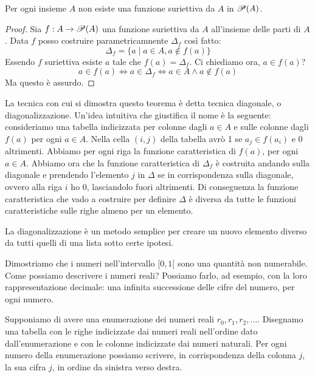 \begin{thm}
    Per ogni insieme $A$ non esiste una funzione suriettiva da $A$ in $\mathscr{P}(A)$.
\end{thm}
\begin{proof}
    Sia $f : A \to \mathscr{P}(A)$ una funzione suriettiva da $A$ all'insieme delle parti di $A$. Data
    $f$ posso costruire parametricamnente $\Delta_{f}$ così fatto:
    \begin{equation*}
        \Delta_{f} = \{a \mid a \in A, a \notin f(a)\}
    \end{equation*}
    Essendo $f$ suriettiva esiste $a$ tale che $f(a) = \Delta_{f}$. Ci chiediamo ora, $a \in f(a)$?
    \begin{equation*}
        a \in f(a) \iff a \in \Delta_{f} \iff a \in A \land a \notin f(a)
    \end{equation*}
    Ma questo è assurdo.
\end{proof}

La tecnica con cui si dimostra questo teorema è detta tecnica diagonale, o diagonalizzazione.
Un'idea intuitiva che giustifica il nome è la seguente: consideriamo una tabella indicizzata per
colonne dagli $a \in A$ e sulle colonne dagli $f(a)$ per ogni $a \in A$. Nella cella $(i,j)$ della
tabella avrò 1 se $a_{j} \in f(a_{i})$ e 0 altrimenti. Abbiamo per ogni riga la funzione
caratteristica di $f(a)$, per ogni $a \in A$. Abbiamo ora che la funzione caratteristica di
$\Delta_{f}$ è costruita andando sulla diagonale e prendendo l'elemento $j$ in $\Delta$ se in
corrispondenza sulla diagonale, ovvero alla riga $i$ ho 0, lasciandolo fuori altrimenti. Di
conseguenza la funzione caratteristica che vado a costruire per definire $\Delta$ è diversa da
tutte le funzioni caratteristiche sulle righe almeno per un elemento.

La diagonalizzazione è un metodo semplice per creare un nuovo elemento diverso da tutti quelli di
una lista sotto certe ipotesi.

Dimostriamo che i numeri nell'intervallo $[0,1[$ sono una quantità non numerabile. Come possiamo
descrivere i numeri reali? Possiamo farlo, ad esempio, con la loro rappresentazione decimale: una
infinita successione delle cifre del numero, per ogni numero.

Supponiamo di avere una enumerazione dei numeri reali $r_{0}, r_{1}, r_{2}, \dotsc$. Disegnamo una
tabella con le righe indicizzate dai numeri reali nell'ordine dato dall'enumerazione e con le
colonne indicizzate dai numeri naturali. Per ogni numero della enumerazione possiamo scrivere, in
corrispondenza della colonna $j$, la sua cifra $j$, in ordine da sinistra verso destra. 

